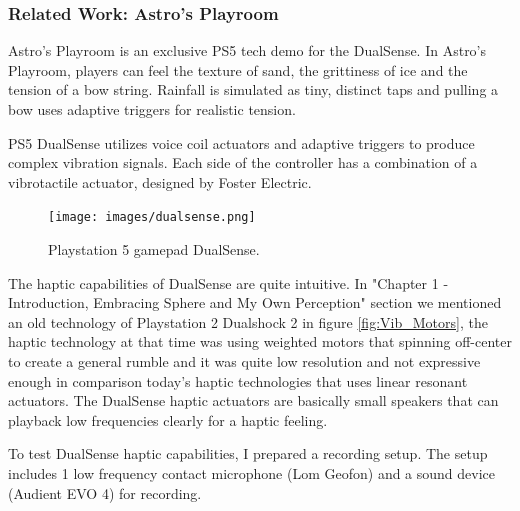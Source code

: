             \subsubsection{Related Work: Astro's Playroom}
                Astro's Playroom is an exclusive PS5 tech demo for the DualSense. In Astro's Playroom, players can feel the texture of sand, the grittiness of ice and the tension of a bow string. Rainfall is simulated as tiny, distinct taps and pulling a bow uses adaptive triggers for realistic tension.\par

                PS5 DualSense utilizes voice coil actuators and adaptive triggers to produce complex vibration signals\cite{What_is_under_Dualsense}. Each side of the controller has a combination of a vibrotactile actuator, designed by Foster Electric.\par
                
                \begin{figure}[H]
                    \centering
                    \texttt{[image: images/dualsense.png]}
                    \caption{Playstation 5 gamepad DualSense.}
                    \label{fig:DUALSENSE}
                \end{figure}

                The haptic capabilities of DualSense are quite intuitive. In "Chapter 1 - Introduction, Embracing Sphere and My Own Perception" section we mentioned an old technology of Playstation 2 Dualshock 2 in figure \ref{fig:Vib_Motors}, the haptic technology at that time was using weighted motors that spinning off-center to create a general rumble and it was quite low resolution and not expressive enough in comparison today's haptic technologies that uses linear resonant actuators\cite{Audio-Tactile_Rendering}. The DualSense haptic actuators are basically small speakers that can playback low frequencies clearly for a haptic feeling.\par

                To test DualSense haptic capabilities, I prepared a recording setup. The setup includes 1 low frequency contact microphone (Lom Geofon) and a sound device (Audient EVO 4) for recording.\par

